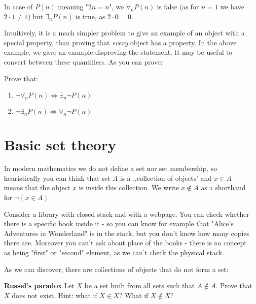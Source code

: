 \begin{example}
  In case of $P(n)$ meaning "$2n=n$", we $\forall_n P(n)$ is false (as for $n=1$ we have $2\cdot 1\neq 1$) but $\exists_n P(n)$ is true,
  as $2\cdot 0=0$.
\end{example}

Intuitively, it is a much simpler problem to give an example of an object with a special property, than proving that \emph{every} object has a property.
In the above example, we gave an example disproving the statement. It may be useful to convert between these quantifiers. As you can prove:

\begin{exercise}
  Prove that:
  \begin{enumerate}
    \item $\neg \forall_n P(n) \Leftrightarrow \exists_n \neg P(n)$
    \item $\neg \exists_n P(n) \Leftrightarrow \forall_n \neg P(n)$
  \end{enumerate}
\end{exercise}

\section{Basic set theory}
\label{sec:basic_set_theory}

In modern mathematics we do not define a set nor set membership, so heuristically you can think that set $A$
is a ,,collection of objects' and $x\in A$ means that the object $x$ is inside this collection.
We write $x\notin A$ as a shorthand for $\neg (x\in A)$

\begin{example}
  Consider a library with closed stack and with a webpage. You can check whether there is a specific book inside it -
  so you can know for example that "Alice's Adventures in Wonderland"
  is in the stack, but you don't know how many copies there are. Moreover you can't ask about place of the books - there is no concept as being "first" or "second" element,
  as we can't check the physical stack.
\end{example}

As we can discover, there are collections of objects that do not form a set:
\begin{prob}
  \textbf{Russel's paradox}
  Let $X$ be a set built from all sets such that $A\notin A.$ Prove that $X$ does not exist. Hint: what if $X\in X$? What if $X\notin X$?
\end{prob}

